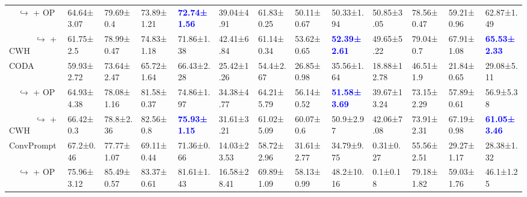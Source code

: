 \begin{table*}[ht]
{\begin{tabular}{l|llla|llla|llla}
\ \  $\hookrightarrow$ + OP                  & 64.64{\scriptsize±3.07} & 79.69{\scriptsize±0.4} & 73.89{\scriptsize±1.21} & \textbf{\textcolor{blue}{72.74{\scriptsize±1.56}}} & 39.04{\scriptsize±4.91} & 61.83{\scriptsize±0.25} & 50.11{\scriptsize±0.67} & 50.33{\scriptsize±1.94} & 50.85{\scriptsize±3.05} & 78.56{\scriptsize±0.47} & 59.21{\scriptsize±0.96} & 62.87{\scriptsize±1.49} \\
\ \ \ \ \ \ $\hookrightarrow$ + CWH          & 61.75{\scriptsize±2.5} & 78.99{\scriptsize±0.47} & 74.83{\scriptsize±1.18} & 71.86{\scriptsize±1.38} & 42.41{\scriptsize±6.84} & 61.14{\scriptsize±0.34} & 53.62{\scriptsize±0.65} & \textbf{\textcolor{blue}{52.39{\scriptsize±2.61}}} & 49.65{\scriptsize±5.22} & 79.04{\scriptsize±0.7} & 67.91{\scriptsize±1.08} & \textbf{\textcolor{blue}{65.53{\scriptsize±2.33}}} \\
\hline
CODA                                          & 59.93{\scriptsize±2.72} & 73.64{\scriptsize±2.47} & 65.72{\scriptsize±1.64} & 66.43{\scriptsize±2.28} & 25.42{\scriptsize±1.26} & 54.4{\scriptsize±2.67} & 26.85{\scriptsize±0.98} & 35.56{\scriptsize±1.64} & 18.88{\scriptsize±12.78} & 46.51{\scriptsize±1.9} & 21.84{\scriptsize±0.65} & 29.08{\scriptsize±5.11} \\
\ \  $\hookrightarrow$ + OP                   & 64.93{\scriptsize±4.38} & 78.08{\scriptsize±1.16} & 81.58{\scriptsize±0.37} & 74.86{\scriptsize±1.97} & 34.38{\scriptsize±4.77} & 64.21{\scriptsize±5.79} & 56.14{\scriptsize±0.52} & \textbf{\textcolor{blue}{51.58{\scriptsize±3.69}}} & 39.67{\scriptsize±13.24} & 73.15{\scriptsize±2.29} & 57.89{\scriptsize±0.61} & 56.9{\scriptsize±5.38} \\
\ \ \ \ \ \ $\hookrightarrow$ + CWH          & 66.42{\scriptsize±0.3} & 78.8{\scriptsize±2.36} & 82.56{\scriptsize±0.8} & \textbf{\textcolor{blue}{75.93{\scriptsize±1.15}}} & 31.61{\scriptsize±3.21} & 61.02{\scriptsize±5.09} & 60.07{\scriptsize±0.6} & 50.9{\scriptsize±2.97} & 42.06{\scriptsize±7.08} & 73.91{\scriptsize±2.31} & 67.19{\scriptsize±0.98} & \textbf{\textcolor{blue}{61.05{\scriptsize±3.46}}} \\
\hline
ConvPrompt                                   & 67.2{\scriptsize±0.46} & 77.77{\scriptsize±1.07} & 69.11{\scriptsize±0.44} & 71.36{\scriptsize±0.66} & 14.03{\scriptsize±23.53} & 58.72{\scriptsize±2.96} & 31.61{\scriptsize±2.77} & 34.79{\scriptsize±9.75} & 0.31{\scriptsize±0.27} & 55.56{\scriptsize±2.51} & 29.27{\scriptsize±1.17} & 28.38{\scriptsize±1.32} \\
\ \  $\hookrightarrow$ + OP                  & 75.96{\scriptsize±3.12} & 85.49{\scriptsize±0.57} & 83.37{\scriptsize±0.61} & 81.61{\scriptsize±1.43} & 16.58{\scriptsize±28.41} & 69.89{\scriptsize±1.09} & 58.13{\scriptsize±0.99} & 48.2{\scriptsize±10.16} & 0.1{\scriptsize±0.18} & 79.18{\scriptsize±1.82} & 59.03{\scriptsize±1.76} & 46.1{\scriptsize±1.25} \\

\end{tabular}}
\end{table*}
